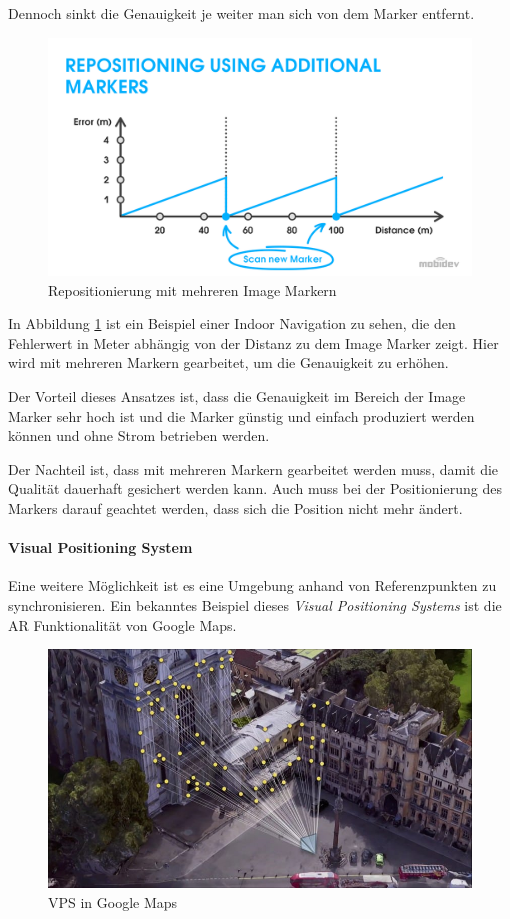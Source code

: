 \documentclass[titlepage, a4paper, 11pt]{scrartcl}
\begin{document}
  Dennoch sinkt die Genauigkeit je weiter man sich von dem Marker entfernt.

  \begin{figure}[h]
    \centering
    \includegraphics[width=.6\textwidth]{multi-marker}
    \caption{Repositionierung mit mehreren Image Markern \cite{HowAugme98:online}}
    \label{MultiMarker}
  \end{figure}

  In Abbildung \ref{MultiMarker} ist ein Beispiel einer Indoor Navigation zu sehen, die den Fehlerwert in Meter abhängig von der Distanz zu dem Image Marker zeigt.
  Hier wird mit mehreren Markern gearbeitet, um die Genauigkeit zu erhöhen.

  Der Vorteil dieses Ansatzes ist, dass die Genauigkeit im Bereich der Image Marker sehr hoch ist und die Marker günstig und einfach produziert werden können und ohne Strom betrieben werden.

  Der Nachteil ist, dass mit mehreren Markern gearbeitet werden muss, damit die Qualität dauerhaft gesichert werden kann. Auch muss bei der Positionierung des Markers darauf geachtet werden, dass sich die Position nicht mehr ändert.

  \paragraph{Visual Positioning System}

  Eine weitere Möglichkeit ist es eine Umgebung anhand von Referenzpunkten zu synchronisieren.
  Ein bekanntes Beispiel dieses \textit{Visual Positioning Systems} ist die AR Funktionalität von Google Maps.
  
  \begin{figure}[h]
    \centering
    \includegraphics[width=.5\textwidth]{vps-google}
    \caption{VPS in Google Maps \cite{GoogleMa12:online}}
    \label{VPSGoogle}
  \end{figure}
\end{document}
